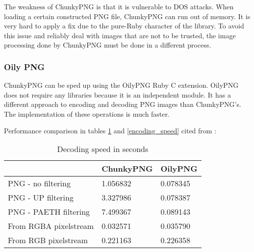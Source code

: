 The weakness of ChunkyPNG is that it is vulnerable to DOS attacks. When loading a certain constructed PNG file, ChunkyPNG can run out of memory. It is very hard to apply a fix due to the pure-Ruby character of the library. To avoid this issue and reliably deal with images that are not to be trusted, the image processing done by ChunkyPNG must be done in a different process.


\subsubsection{Oily PNG}
ChunkyPNG can be sped up using the OilyPNG Ruby C extension. OilyPNG does not require any libraries because it is an independent module. It has a different approach to encoding and decoding PNG images than ChunkyPNG's. The implementation of these operations is much faster.

Performance comparison in tables \ref{decoding_speed} and \ref{encoding_speed} cited from \cite{encode_decode_speed}:

\begin{table}[ht!]
\centering
\caption{Decoding speed in seconds}
{
\renewcommand{\arraystretch}{1.25}
\begin{tabular}{ lll }
                        &  ChunkyPNG   &  OilyPNG   \\ \hline
PNG - no filtering      & 1.056832   & 0.078345 \\
PNG - UP filtering      & 3.327986   & 0.078387 \\
PNG - PAETH filtering   & 7.499367   & 0.089143 \\
From RGBA pixelstream   & 0.032571   & 0.035790 \\
From RGB pixelstream    & 0.221163   & 0.226358 \\
\end{tabular}
}
\label{decoding_speed}
\end{table}

